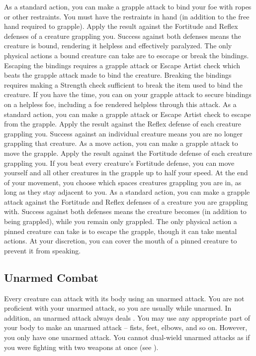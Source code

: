              As a standard action, you can make a grapple attack to bind your foe with ropes or other restraints. You must have the restraints in hand (in addition to the free hand required to grapple). Apply the result against the Fortitude and Reflex defenses of a creature grappling you. Success against both defenses means the creature is bound, rendering it helpless and effectively paralyzed. The only physical actions a bound creature can take are to esccape or break the bindings. Escaping the bindings requires a grapple attack or Escape Artist check which beats the grapple attack made to bind the creature. Breaking the bindings requires making a Strength check sufficient to break the item used to bind the creature. If you have the time, you can  on your grapple attack to secure bindings on a helpless foe, including a foe rendered helpless through this attack.
             As a standard action, you can make a grapple attack or Escape Artist check to escape from the grapple. Apply the result against the Reflex defense of each creature grappling you. Success against an individual creature means you are no longer grappling that creature.
             As a move action, you can make a grapple attack to move the grapple. Apply the result against the Fortitude defense of each creature grappling you. If you beat every creature's Fortitude defense, you can move yourself and all other creatures in the grapple up to half your speed. At the end of your movement, you choose which spaces creatures grappling you are in, as long as they stay adjacent to you.
             As a standard action, you can make a grapple attack against the Fortitude and Reflex defenses of a creature you are grappling with. Success against both defenses means the creature becomes  (in addition to being grappled), while you remain only grappled. The only physical action a pinned creature can take is to escape the grapple, though it can take mental actions. At your discretion, you can cover the mouth of a pinned creature to prevent it from speaking.

    \subsection{Unarmed Combat}\label{Unarmed Combat}
        Every creature can attack with its body using an unarmed attack.
        You are not proficient with your unarmed attack, so you are usually  while unarmed.
        In addition, an unarmed attack always deals .
        You may use any appropriate part of your body to make an unarmed attack -- fists, feet, elbows, and so on.
        However, you only have one unarmed attack.
        You cannot dual-wield unarmed attacks as if you were fighting with two weapons at once (see ).

